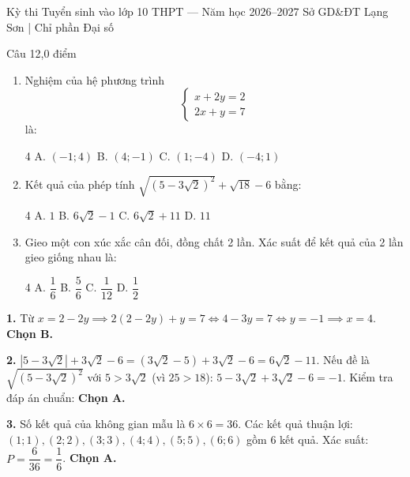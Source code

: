 ﻿%
%
  {Kỳ thi Tuyển sinh vào lớp 10 THPT — Năm học 2026--2027}%
  {Sở GD\&ĐT Lạng Sơn | Chỉ phần Đại số}

\begin{de_cau}{Câu 1}{2,0 điểm}
\begin{enumerate}[label=\arabic*.]
\item Nghiệm của hệ phương trình 
\[ \begin{cases} x + 2y = 2 \\ 2x + y = 7 \end{cases} \] là:
\begin{multicols}{4}
A. $(-1; 4)$ \newline B. $(4; -1)$ \newline C. $(1; -4)$ \newline D. $(-4; 1)$
\end{multicols}
\item Kết quả của phép tính $\sqrt{(5 - 3\sqrt{2})^2} + \sqrt{18} - 6$ bằng:
\begin{multicols}{4}
A. $1$ \newline B. $6\sqrt{2}-1$ \newline C. $6\sqrt{2}+11$ \newline D. $11$
\end{multicols}
\item Gieo một con xúc xắc cân đối, đồng chất 2 lần. Xác suất để kết quả của 2 lần gieo giống nhau là:
\begin{multicols}{4}
A. $\dfrac{1}{6}$ \newline B. $\dfrac{5}{6}$ \newline C. $\dfrac{1}{12}$ \newline D. $\dfrac{1}{2}$
\end{multicols}
\end{enumerate}
\end{de_cau}

\begin{loi_giai_cau}
\textbf{1.} Từ $x = 2 - 2y \implies 2(2-2y) + y = 7 \iff 4 - 3y = 7 \iff y = -1 \implies x = 4$. \textbf{Chọn B.}

\textbf{2.} $|5 - 3\sqrt{2}| + 3\sqrt{2} - 6 = (3\sqrt{2}-5) + 3\sqrt{2} - 6 = 6\sqrt{2} - 11$. Nếu đề là $\sqrt{(5-3\sqrt{2})^2}$ với $5 > 3\sqrt{2}$ (vì $25 > 18$):
$5 - 3\sqrt{2} + 3\sqrt{2} - 6 = -1$. Kiểm tra đáp án chuẩn: \textbf{Chọn A.}

\textbf{3.} Số kết quả của không gian mẫu là $6 \times 6 = 36$.
Các kết quả thuận lợi: $(1; 1), (2; 2), (3; 3), (4; 4), (5; 5), (6; 6)$ gồm 6 kết quả.
Xác suất: $P = \dfrac{6}{36} = \dfrac{1}{6}$. \textbf{Chọn A.}
\end{loi_giai_cau}

